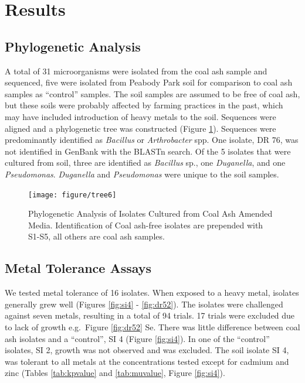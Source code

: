 \documentclass[ms, hidelinks]{uncgdissertationexp}
\theoremstyle{plain}
\theoremstyle{definition}
\theoremstyle{remark}
\begin{document}
\hypertarget{results-1}{%
\section{Results}\label{results-1}}

\hypertarget{phylogenetic-analysis}{%
\subsection{Phylogenetic Analysis}\label{phylogenetic-analysis}}

A total of 31 microorganisms were isolated from the coal ash sample and sequenced, five were isolated from Peabody Park soil for comparison to coal ash samples as ``control'' samples. The soil samples are assumed to be free of coal ash, but these soils were probably affected by farming practices in the past, which may have included introduction of heavy metals to the soil. Sequences were aligned and a phylogenetic tree was constructed (Figure \ref{fig:tree}). Sequences were predominantly identified as \emph{Bacillus} or \emph{Arthrobacter} spp. One isolate, DR 76, was not identified in GenBank with the BLASTn search. Of the 5 isolates that were cultured from soil, three are identified as \emph{Bacillus} sp., one \emph{Duganella}, and one \emph{Pseudomonas}. \emph{Duganella} and \emph{Pseudomonas} were unique to the soil samples.
\begin{figure}[htbp]
  \centering
  \texttt{[image: figure/tree6]}
  \caption[Phylogenetic Analysis of Isolates Cultured from Coal Ash Amended Media.]{Phylogenetic Analysis of Isolates Cultured from Coal Ash Amended Media. Identification of Coal ash-free isolates are prepended with S1-S5, all others are coal ash samples.}\label{fig:tree}
\end{figure}

\hypertarget{metal-tolerance-assays}{%
\subsection{Metal Tolerance Assays}\label{metal-tolerance-assays}}

We tested metal tolerance of 16 isolates. When exposed to a heavy metal, isolates generally grew well (Figures \ref{fig:si4} - \ref{fig:dr52}). The isolates were challenged against seven metals, resulting in a total of 94 trials. 17 trials were excluded due to lack of growth e.g.~Figure \ref{fig:dr52} Se. There was little difference between coal ash isolates and a ``control'', SI 4 (Figure \ref{fig:si4}). In one of the ``control'' isolates, SI 2, growth was not observed and was excluded. The soil isolate SI 4, was tolerant to all metals at the concentrations tested except for cadmium and zinc (Tables \ref{tab:kpvalue} and \ref{tab:muvalue}, Figure \ref{fig:si4}).
\end{document}
